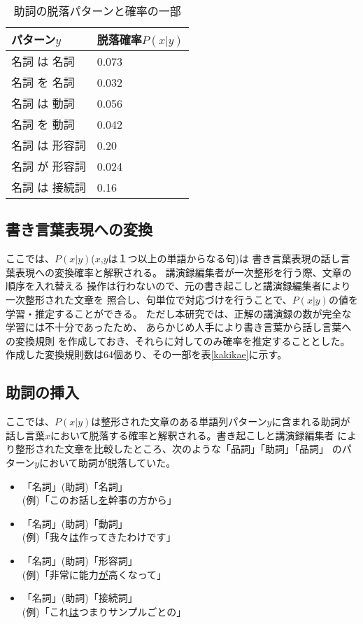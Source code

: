 \begin{table}[t]
\begin{center}
\caption{助詞の脱落パターンと確率の一部}\label{joshi}
\vspace{2.0mm}
\begin{tabular}{|l|l|}					\hline
パターン$y$		& 脱落確率$P(x|y)$		\\\hline\hline
名詞 は 名詞		& 0.073   			\\
名詞 を 名詞		& 0.032				\\\hline
名詞 は 動詞		& 0.056				\\
名詞 を 動詞 		& 0.042 			\\\hline
名詞 は 形容詞		& 0.20			 	\\
名詞 が 形容詞		& 0.024 			\\\hline
名詞 は 接続詞		& 0.16				\\\hline
\end{tabular}
\end{center}
\end{table}

\subsection{書き言葉表現への変換}

ここでは、$P(x|y)$($x$,$y$は１つ以上の単語からなる句)は
書き言葉表現の話し言葉表現への変換確率と解釈される。
講演録編集者が一次整形を行う際、文章の順序を入れ替える
操作は行わないので、元の書き起こしと講演録編集者により一次整形された文章を
照合し、句単位で対応づけを行うことで、$P(x|y)$の値を学習・推定することができる。
ただし本研究では、正解の講演録の数が完全な学習には不十分であったため、
あらかじめ人手により書き言葉から話し言葉への変換規則
を作成しておき、それらに対してのみ確率を推定することとした。
作成した変換規則数は64個あり、その一部を表\ref{kakikae}に示す。

\subsection{助詞の挿入}

ここでは、$P(x|y)$は整形された文章のある単語列パターン$y$に含まれる助詞が
話し言葉$x$において脱落する確率と解釈される。書き起こしと講演録編集者
により整形された文章を比較したところ、次のような「品詞」「助詞」「品詞」
のパターン$y$において助詞が脱落していた。
\begin{itemize}
\item 「名詞」(助詞)「名詞」\\ (例)「このお話し\underline{を}幹事の方から」
\item 「名詞」(助詞)「動詞」\\ (例)「我々\underline{は}作ってきたわけです」
\item 「名詞」(助詞)「形容詞」\\ (例)「非常に能力\underline{が}高くなって」
\item 「名詞」(助詞)「接続詞」\\ (例)「これ\underline{は}つまりサンプルごとの」
\end{itemize}

